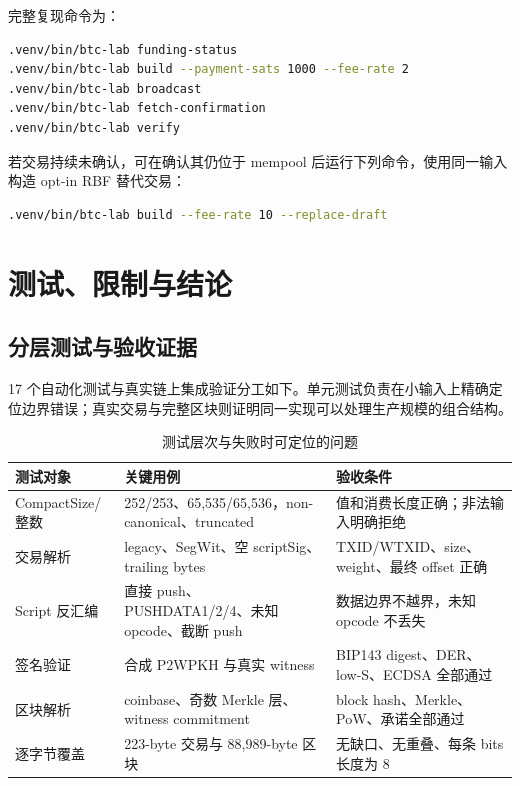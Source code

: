 \documentclass[11pt,a4paper,fontset=none]{ctexart}
\begin{document}
完整复现命令为：
\begin{lstlisting}[language=bash]
.venv/bin/btc-lab funding-status
.venv/bin/btc-lab build --payment-sats 1000 --fee-rate 2
.venv/bin/btc-lab broadcast
.venv/bin/btc-lab fetch-confirmation
.venv/bin/btc-lab verify
\end{lstlisting}
若交易持续未确认，可在确认其仍位于 mempool 后运行下列命令，使用同一输入构造 opt-in RBF 替代交易：
\begin{lstlisting}[language=bash]
.venv/bin/btc-lab build --fee-rate 10 --replace-draft
\end{lstlisting}

\section{测试、限制与结论}

\subsection{分层测试与验收证据}

17 个自动化测试与真实链上集成验证分工如下。单元测试负责在小输入上精确定位边界错误；真实交易与完整区块则证明同一实现可以处理生产规模的组合结构。

\begin{table}[H]
\centering
\caption{测试层次与失败时可定位的问题}
\label{tab:task1-tests}
\begin{tabular}{p{}p{}p{}}
\toprule
测试对象 & 关键用例 & 验收条件 \\
\midrule
CompactSize/整数 & 252/253、65,535/65,536，non-canonical、truncated & 值和消费长度正确；非法输入明确拒绝 \\
交易解析 & legacy、SegWit、空 scriptSig、trailing bytes & TXID/WTXID、size、weight、最终 offset 正确 \\
Script 反汇编 & 直接 push、PUSHDATA1/2/4、未知 opcode、截断 push & 数据边界不越界，未知 opcode 不丢失 \\
签名验证 & 合成 P2WPKH 与真实 witness & BIP143 digest、DER、low-S、ECDSA 全部通过 \\
区块解析 & coinbase、奇数 Merkle 层、witness commitment & block hash、Merkle、PoW、承诺全部通过 \\
逐字节覆盖 & 223-byte 交易与 88,989-byte 区块 & 无缺口、无重叠、每条 bits 长度为 8 \\
\bottomrule
\end{tabular}
\end{table}
\end{document}
